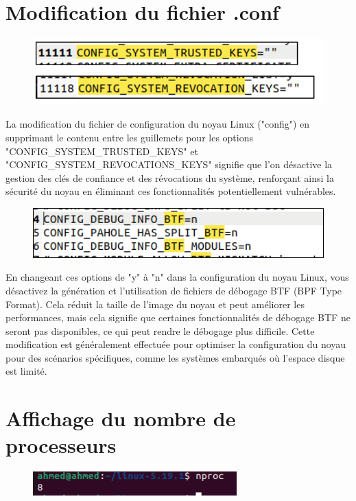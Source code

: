 \section{Modification du fichier .conf}
\begin{figure}[h]
    \includegraphics[width=1\textwidth]{images/35.png}   
\end{figure}
La modification du fichier de configuration du noyau Linux ("config") en supprimant le contenu entre les guillemets pour les options "CONFIG\_SYSTEM\_TRUSTED\_KEYS" et "CONFIG\_SYSTEM\_REVOCATIONS\_KEYS" signifie que l'on désactive la gestion des clés de confiance et des révocations du système, renforçant ainsi la sécurité du noyau en éliminant ces fonctionnalités potentiellement vulnérables.
\begin{figure}[h]
    \includegraphics[width=1\textwidth]{images/36.png}   
\end{figure}
En changeant ces options de "y" à "n" dans la configuration du noyau Linux, vous désactivez la génération et l'utilisation de fichiers de débogage BTF (BPF Type Format). Cela réduit la taille de l'image du noyau et peut améliorer les performances, mais cela signifie que certaines fonctionnalités de débogage BTF ne seront pas disponibles, ce qui peut rendre le débogage plus difficile. Cette modification est généralement effectuée pour optimiser la configuration du noyau pour des scénarios spécifiques, comme les systèmes embarqués où l'espace disque est limité.
\section{Affichage du nombre de processeurs}
\begin{figure}[h]
    \includegraphics[width=0.7\textwidth]{images/37.png}   
\end{figure}
